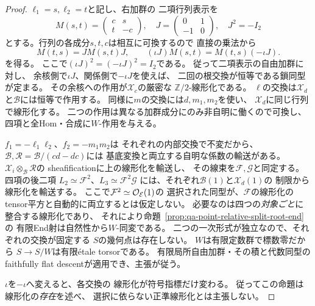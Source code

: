 \begin{proof}
$\ell_1=s,\ell_2=t$と記し、右加群の
二項行列表示を
\[
 M(s,t)=\begin{pmatrix}c&s\\t&-c\end{pmatrix},
 \quad
 J=\begin{pmatrix}0&1\\-1&0\end{pmatrix},
 \quad J^2=-I_2
\]
とする。行列の各成分$s,t,c$は相互に可換するので
直接の乗法から
\[
 M(t,s)=JM(s,t)J,\qquad
 (\iota J)M(s,t)=M(t,s)(-\iota J).
 \tag{Swap-matrix}\label{eq:qa-root-swap-matrix}
\]
を得る。
ここで$(\iota J)^2=(-\iota J)^2=I_2$である。
従って二項表示の自由加群に対し、
余核側で$\iota J$、関係側で$-\iota J$を使えば、
二回の根交換が恒等である鎖同型が定まる。
その余核への作用が$\mathcal X_c$の厳密な
$\mathbb Z/2$-線形化である。
$\ell$の交換は$\mathcal X_d$と$\mathcal B$には恒等で作用する。
同様に$m$の交換には$d,m_1,m_2$を使い、
$\mathcal X_d$に同じ行列で線形化する。
二つの作用は異なる加群成分にのみ非自明に働くので可換し、
四項と全Hom・合成に$W$-作用を与える。

$f_1=-\ell_1\ell_2$、$f_2=-m_1m_2$は
それぞれの内部交換で不変だから、
$\mathcal B,\mathcal R=\mathcal B/(cd-dc)$には
基底変換と両立する自明な係数の輸送がある。
$\mathcal X_i\otimes_{\mathcal B}\mathcal R$の
sheafificationに上の線形化を輸送し、
その線束を$\mathcal F,\mathcal G$と同定する。
四項の後二項
$L_2\simeq\mathcal F^2$、$L_3\simeq\mathcal F^2\mathcal G$
には、それぞれ$\mathcal B(1)$と$\mathcal X_d(1)$の
制限から線形化を輸送する。
ここで$\mathcal F^2\simeq\mathcal O_{\mathcal E}(1)$の
選択された同型が、$\mathcal F$の線形化の
tensor平方と自動的に両立するとは仮定しない。
必要なのは四つの\emph{対象ごと}に整合する線形化であり、
それにより命題~\ref{prop:qa-point-relative-split-root-end}の
有限End射は自然性から$W$-同変である。
二つの一次形式が独立なので、それぞれの交換が固定する
$S$の幾何点は存在しない。
$W$は有限定数群で標数零だから
$S\to S/W$は有限\'{e}tale torsorである。
有限局所自由加群・その積と代数同型の
faithfully flat descentが適用でき、主張が従う。

$\iota$を$-\iota$へ変えると、各交換の
線形化が符号指標だけ変わる。
従ってこの命題は線形化の\emph{存在}を述べ、
選択に依らない正準線形化とは主張しない。
\end{proof}

